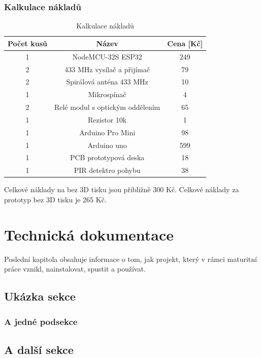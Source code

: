 \documentclass[11pt,a4paper,twoside,openright]{report}
\begin{document}
\subsection{Kalkulace nákladů}

\begin{table}[htb]
\centering
\begin{tabular}{|c|c|c|}
	\hline
	Počet kusů & Název & Cena [Kč] \\
	\hline
	1 & NodeMCU-32S ESP32 & 249  \\
	\hline
	2 & 433 MHz vysílač a přijímač & 79 \\
	\hline
	2 & Spirálová anténa 433 MHz & 10 \\
	\hline
	1 & Mikrospínač & 4 \\
	\hline
	2 & Relé modul s optickým oddělením & 65 \\
	\hline
	1 & Rezistor 10k & 1 \\
	\hline
	1 & Arduino Pro Mini & 98 \\
	\hline
	1 & Arduino uno & 599 \\
	\hline
	1 & PCB prototypová deska & 18 \\
	\hline
	1 & PIR detektro pohybu & 38 \\
	\hline
\end{tabular}
\caption{Kalkulace nákladů}
\end{table}

Celkové náklady na  bez 3D tisku jsou přibližně 300 Kč.
Celkové náklady za prototyp  bez 3D tisku je 265 Kč.


\chapter{Technická dokumentace}

Poslední kapitola obsahuje informace o tom, jak projekt, který v rámci maturitní práce vznikl, nainstalovat, spustit a používat.

\section{Ukázka sekce}


\subsection{A jedné podsekce}


\section{A další sekce}
\end{document}

